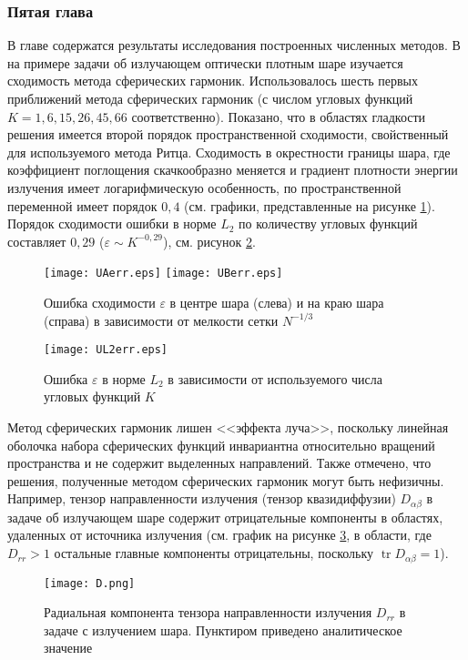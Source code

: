 \subsubsection*{Пятая глава}
В главе содержатся результаты исследования построенных численных методов. В  на примере задачи об излучающем оптически плотным шаре изучается сходимость метода сферических гармоник. Использовалось шесть первых приближений метода сферических гармоник (с числом угловых функций $K = 1, 6, 15, 26, 45, 66$ соответственно).
Показано, что в областях гладкости решения имеется второй порядок пространственной сходимости, свойственный для используемого метода Ритца. Сходимость в окрестности границы шара, где коэффициент поглощения скачкообразно меняется и градиент плотности энергии излучения имеет логарифмическую особенность, по пространственной переменной имеет порядок $0,4$ (см. графики, представленные на рисунке \ref{fig:sphconv}). Порядок сходимости ошибки в норме $L_2$ по количеству угловых функций составляет $0,29$ ($\varepsilon \sim K^{-0,29}$), см. рисунок \ref{fig:angconv}.
\begin{figure}[ht!]
\centering
\texttt{[image: UAerr.eps]}
\texttt{[image: UBerr.eps]}
\caption{Ошибка сходимости $\varepsilon$ в центре шара (слева) и на краю шара (справа) в зависимости от мелкости сетки $N^{-1/3}$}
\label{fig:sphconv}
\end{figure}
\begin{figure}[ht!]
\centering
\texttt{[image: UL2err.eps]}
\caption{Ошибка $\varepsilon$ в норме $L_2$ в зависимости от используемого числа угловых функций $K$}
\label{fig:angconv}
\end{figure}

Метод сферических гармоник лишен <<эффекта луча>>, поскольку линейная оболочка набора сферических функций инвариантна относительно вращений пространства и не содержит выделенных направлений.
Также отмечено, что решения, полученные методом сферических гармоник могут быть нефизичны. Например, тензор направленности излучения (тензор квазидиффузии) $D_{\alpha \beta}$ в задаче об излучающем шаре содержит отрицательные компоненты в областях, удаленных от источника излучения (см. график на рисунке \ref{fig:Drr}, в области, где $D_{rr} > 1$ остальные главные компоненты отрицательны, поскольку $\operatorname{tr} D_{\alpha\beta} = 1$). 
\begin{figure}[ht!]
\centering
\texttt{[image: D.png]}
\caption{Радиальная компонента тензора направленности излучения $D_{rr}$ в задаче с излучением шара. Пунктиром приведено аналитическое значение}
\label{fig:Drr}
\end{figure}


